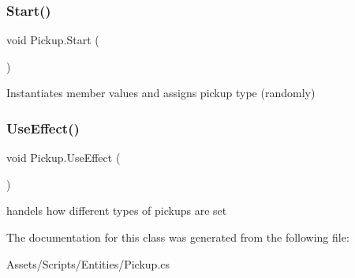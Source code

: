 \subsubsection{\texorpdfstring{Start()}{Start()}}
{\footnotesize\ttfamily void Pickup.\+Start (\begin{DoxyParamCaption}{ }\end{DoxyParamCaption})\hspace{0.3cm}{\ttfamily [private]}}

Instantiates member values and assigns pickup type (randomly) \mbox{\label{class_pickup_a0375f0d9e0a3021b0718e565978498b0}} 
\subsubsection{\texorpdfstring{Use\+Effect()}{UseEffect()}}
{\footnotesize\ttfamily void Pickup.\+Use\+Effect (\begin{DoxyParamCaption}{ }\end{DoxyParamCaption})\hspace{0.3cm}{\ttfamily [private]}}

handels how different types of pickups are set 

The documentation for this class was generated from the following file\+:\begin{DoxyCompactItemize}
\item 
Assets/\+Scripts/\+Entities/Pickup.\+cs\end{DoxyCompactItemize}
